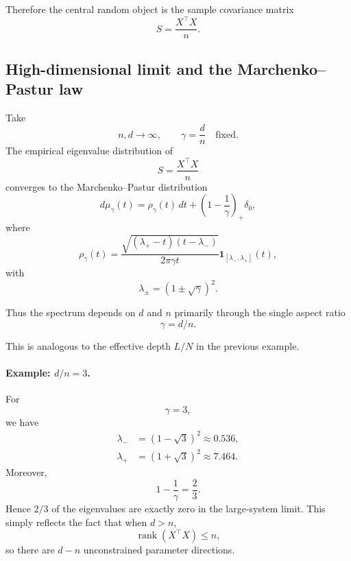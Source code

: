 Therefore the central random object is the sample covariance
matrix
\begin{equation}
    S
    =
    \frac{X^\top X}{n}.
\end{equation}


\subsection{High-dimensional limit and the Marchenko--Pastur law}

Take
\begin{equation}
    n,d\rightarrow\infty,
    \qquad
    \boxed{
        \gamma=\frac{d}{n}
    }
    \quad\text{fixed}.
\end{equation}
The empirical eigenvalue distribution of
\[
S=\frac{X^\top X}{n}
\]
converges to the Marchenko--Pastur distribution
\begin{equation}
    d\mu_\gamma(t)
    =
    \rho_\gamma(t)\,dt
    +
    \left(
        1-\frac{1}{\gamma}
    \right)_+
    \delta_0,
\end{equation}
where
\begin{equation}
    \rho_\gamma(t)
    =
    \frac{
        \sqrt{
            (\lambda_+-t)(t-\lambda_-)
        }
    }{
        2\pi\gamma t
    }
    \mathbf{1}_{[\lambda_-,\lambda_+]}(t),
\end{equation}
with
\begin{equation}
    \boxed{
    \lambda_\pm
    =
    \left(
        1\pm\sqrt{\gamma}
    \right)^2.
    }
\end{equation}

Thus the spectrum depends on \(d\) and \(n\) primarily through
the single aspect ratio
\[
\boxed{\gamma=d/n}.
\]

This is analogous to the effective depth \(L/N\) in the previous
example.


\paragraph{Example: \(d/n=3\).}

For
\[
\gamma=3,
\]
we have
\begin{align}
    \lambda_-
    &=
    (1-\sqrt{3})^2
    \approx0.536,
    \\
    \lambda_+
    &=
    (1+\sqrt{3})^2
    \approx7.464.
\end{align}
Moreover,
\begin{equation}
    1-\frac{1}{\gamma}
    =
    \frac{2}{3}.
\end{equation}
Hence \(2/3\) of the eigenvalues are exactly zero in the
large-system limit.  This simply reflects the fact that when
\(d>n\),
\[
\operatorname{rank}(X^\top X)\le n,
\]
so there are \(d-n\) unconstrained parameter directions.


